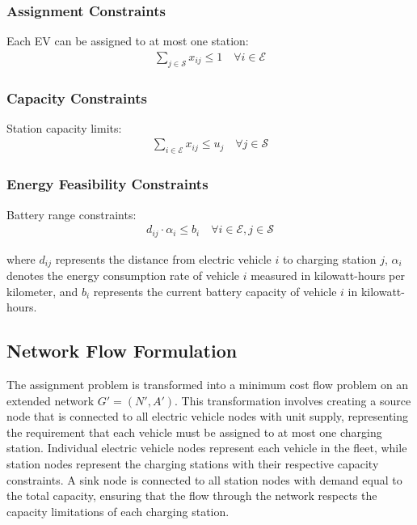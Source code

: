 \documentclass[12pt,a4paper]{article}
\begin{document}
\subsubsection{Assignment Constraints}
Each EV can be assigned to at most one station:
\begin{align}
\sum_{j \in \mathcal{S}} x_{ij} \leq 1 \quad \forall i \in \mathcal{E}
\end{align}

\subsubsection{Capacity Constraints}
Station capacity limits:
\begin{align}
\sum_{i \in \mathcal{E}} x_{ij} \leq u_j \quad \forall j \in \mathcal{S}
\end{align}

\subsubsection{Energy Feasibility Constraints}
Battery range constraints:
\begin{align}
d_{ij} \cdot \alpha_i \leq b_i \quad \forall i \in \mathcal{E}, j \in \mathcal{S}
\end{align}

where $d_{ij}$ represents the distance from electric vehicle $i$ to charging station $j$, $\alpha_i$ denotes the energy consumption rate of vehicle $i$ measured in kilowatt-hours per kilometer, and $b_i$ represents the current battery capacity of vehicle $i$ in kilowatt-hours.

\subsection{Network Flow Formulation}

The assignment problem is transformed into a minimum cost flow problem on an extended network $G' = (N', A')$. This transformation involves creating a source node that is connected to all electric vehicle nodes with unit supply, representing the requirement that each vehicle must be assigned to at most one charging station. Individual electric vehicle nodes represent each vehicle in the fleet, while station nodes represent the charging stations with their respective capacity constraints. A sink node is connected to all station nodes with demand equal to the total capacity, ensuring that the flow through the network respects the capacity limitations of each charging station.
\end{document}
